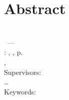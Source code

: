 \chapter*{Abstract}
\thispagestyle{empty}


\myName\\
\myTitle ~--- \mySubtitle\\
\myLocation : \myUni , \myTime , \pageref{LastPage} p.\\
\myDegree , \mySubject\\
Supervisors: \mySupervisor\\

\noindent
\ldots \\

\noindent
Keywords: \myKeywords